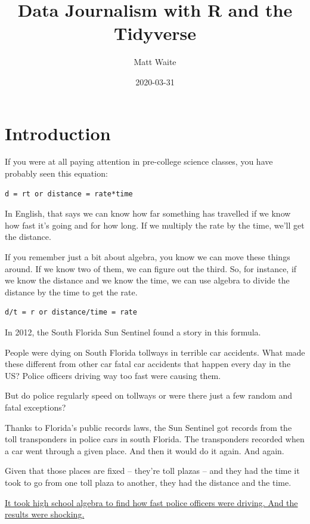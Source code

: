 \documentclass[]{book}
\title{Data Journalism with R and the Tidyverse}
\author{Matt Waite}
\date{2020-03-31}
\begin{document}
\maketitle

{
\setcounter{tocdepth}{1}
\tableofcontents
}
\hypertarget{introduction}{%
\chapter{Introduction}\label{introduction}}

If you were at all paying attention in pre-college science classes, you have probably seen this equation:

\begin{verbatim}
d = rt or distance = rate*time
\end{verbatim}

In English, that says we can know how far something has travelled if we know how fast it's going and for how long. If we multiply the rate by the time, we'll get the distance.

If you remember just a bit about algebra, you know we can move these things around. If we know two of them, we can figure out the third. So, for instance, if we know the distance and we know the time, we can use algebra to divide the distance by the time to get the rate.

\begin{verbatim}
d/t = r or distance/time = rate
\end{verbatim}

In 2012, the South Florida Sun Sentinel found a story in this formula.

People were dying on South Florida tollways in terrible car accidents. What made these different from other car fatal car accidents that happen every day in the US? Police officers driving way too fast were causing them.

But do police regularly speed on tollways or were there just a few random and fatal exceptions?

Thanks to Florida's public records laws, the Sun Sentinel got records from the toll transponders in police cars in south Florida. The transponders recorded when a car went through a given place. And then it would do it again. And again.

Given that those places are fixed -- they're toll plazas -- and they had the time it took to go from one toll plaza to another, they had the distance and the time.

\href{http://www.sun-sentinel.com/news/local/speeding-cops/fl-speeding-cops-20120211,0,3706919.story}{It took high school algebra to find how fast police officers were driving. And the results were shocking.}
\end{document}
